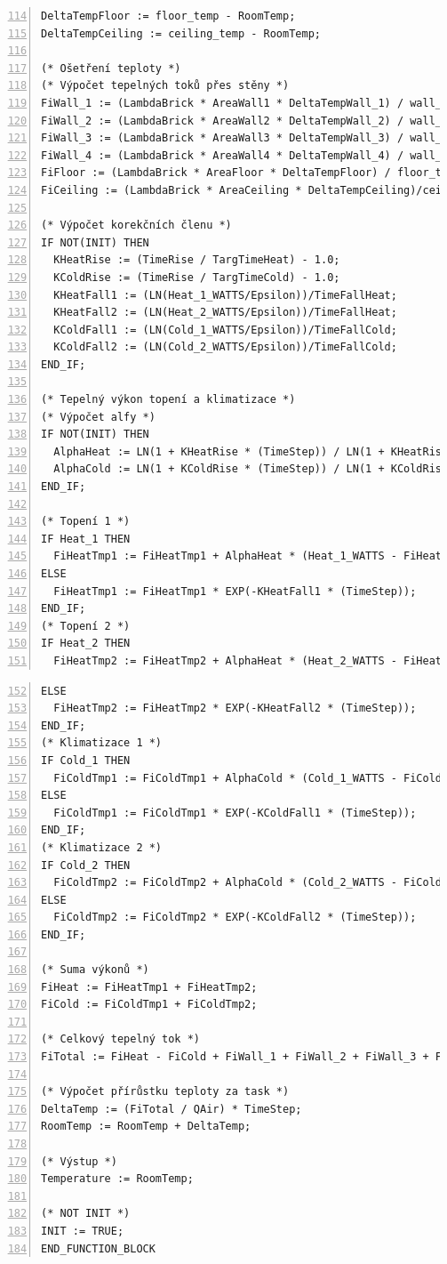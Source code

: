 \begin{lstlisting}[language=ST, breaklines=true, numbers=left, firstnumber=114, numberstyle=\small, numbersep=10pt, frame=single, basicstyle=\ttfamily\small]
DeltaTempFloor := floor_temp - RoomTemp;
DeltaTempCeiling := ceiling_temp - RoomTemp;

(* Ošetření teploty *)
(* Výpočet tepelných toků přes stěny *)
FiWall_1 := (LambdaBrick * AreaWall1 * DeltaTempWall_1) / wall_thic1;
FiWall_2 := (LambdaBrick * AreaWall2 * DeltaTempWall_2) / wall_thic2;
FiWall_3 := (LambdaBrick * AreaWall3 * DeltaTempWall_3) / wall_thic3;
FiWall_4 := (LambdaBrick * AreaWall4 * DeltaTempWall_4) / wall_thic4;
FiFloor := (LambdaBrick * AreaFloor * DeltaTempFloor) / floor_thic;
FiCeiling := (LambdaBrick * AreaCeiling * DeltaTempCeiling)/ceiling_thic;

(* Výpočet korekčních členu *)
IF NOT(INIT) THEN
  KHeatRise := (TimeRise / TargTimeHeat) - 1.0;
  KColdRise := (TimeRise / TargTimeCold) - 1.0;
  KHeatFall1 := (LN(Heat_1_WATTS/Epsilon))/TimeFallHeat;
  KHeatFall2 := (LN(Heat_2_WATTS/Epsilon))/TimeFallHeat;
  KColdFall1 := (LN(Cold_1_WATTS/Epsilon))/TimeFallCold;
  KColdFall2 := (LN(Cold_2_WATTS/Epsilon))/TimeFallCold;
END_IF;

(* Tepelný výkon topení a klimatizace *)
(* Výpočet alfy *)
IF NOT(INIT) THEN
  AlphaHeat := LN(1 + KHeatRise * (TimeStep)) / LN(1 + KHeatRise * TimeRise);
  AlphaCold := LN(1 + KColdRise * (TimeStep)) / LN(1 + KColdRise * TimeRise);
END_IF;

(* Topení 1 *)
IF Heat_1 THEN
  FiHeatTmp1 := FiHeatTmp1 + AlphaHeat * (Heat_1_WATTS - FiHeatTmp1);
ELSE
  FiHeatTmp1 := FiHeatTmp1 * EXP(-KHeatFall1 * (TimeStep));
END_IF;
(* Topení 2 *)
IF Heat_2 THEN
  FiHeatTmp2 := FiHeatTmp2 + AlphaHeat * (Heat_2_WATTS - FiHeatTmp2);
\end{lstlisting}
\pagebreak
\begin{lstlisting}[language=ST, breaklines=true, numbers=left, firstnumber=152, numberstyle=\small, numbersep=10pt, frame=single, basicstyle=\ttfamily\small]
ELSE
  FiHeatTmp2 := FiHeatTmp2 * EXP(-KHeatFall2 * (TimeStep));
END_IF;
(* Klimatizace 1 *)
IF Cold_1 THEN
  FiColdTmp1 := FiColdTmp1 + AlphaCold * (Cold_1_WATTS - FiColdTmp1);
ELSE
  FiColdTmp1 := FiColdTmp1 * EXP(-KColdFall1 * (TimeStep));
END_IF;
(* Klimatizace 2 *)
IF Cold_2 THEN
  FiColdTmp2 := FiColdTmp2 + AlphaCold * (Cold_2_WATTS - FiColdTmp2);
ELSE
  FiColdTmp2 := FiColdTmp2 * EXP(-KColdFall2 * (TimeStep));
END_IF;

(* Suma výkonů *)
FiHeat := FiHeatTmp1 + FiHeatTmp2;
FiCold := FiColdTmp1 + FiColdTmp2;

(* Celkový tepelný tok *)
FiTotal := FiHeat - FiCold + FiWall_1 + FiWall_2 + FiWall_3 + FiWall_4 + FiFloor + FiCeiling;

(* Výpočet přírůstku teploty za task *)
DeltaTemp := (FiTotal / QAir) * TimeStep;
RoomTemp := RoomTemp + DeltaTemp;

(* Výstup *)
Temperature := RoomTemp;

(* NOT INIT *)
INIT := TRUE;
END_FUNCTION_BLOCK
\end{lstlisting}
\newpage
